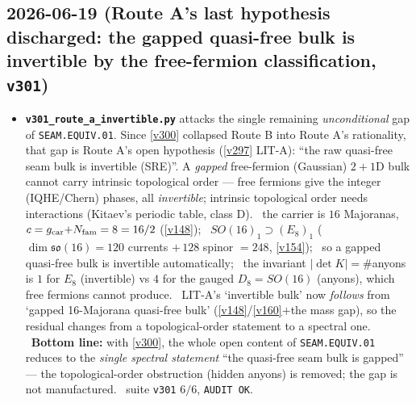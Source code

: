 \subsection*{2026-06-19 (Route A's last hypothesis discharged: the gapped quasi-free bulk is invertible by the free-fermion classification, \texttt{v301})}
\begin{itemize}
\item \textbf{\texttt{v301\_route\_a\_invertible.py}} attacks the single remaining \emph{unconditional} gap of
  \texttt{SEAM.EQUIV.01}.  Since \vref{v300} collapsed Route B into Route A's rationality, that gap is Route A's
  open hypothesis (\vref{v297} LIT-A): ``the raw quasi-free seam bulk is invertible (SRE)''.  A \emph{gapped}
  free-fermion (Gaussian) $2{+}1$D bulk cannot carry intrinsic topological order --- free fermions give the
  integer (IQHE/Chern) phases, all \emph{invertible}; intrinsic topological order needs interactions (Kitaev's
  periodic table, class D).  \mE\ the carrier is $16$ Majoranas, $c=g_{\mathrm{car}}{+}N_{\mathrm{fam}}=8=16/2$
  (\vref{v148}); \mE\ $SO(16)_1\supset(E_8)_1$ ($\dim\mathfrak{so}(16)=120$ currents $+\,128$ spinor $=248$,
  \vref{v154}); \mC\ so a gapped quasi-free bulk is invertible automatically; \mE\ the invariant
  $|\det K|=\#$anyons is $1$ for $E_8$ (invertible) vs $4$ for the gauged $D_8{=}SO(16)$ (anyons), which free
  fermions cannot produce.  \mO\ LIT-A's `invertible bulk' now \emph{follows} from `gapped 16-Majorana quasi-free
  bulk' (\vref{v148}/\vref{v160}$+$the mass gap), so the residual changes from a topological-order statement to a
  spectral one.  \mO\ \textbf{Bottom line:} with \vref{v300}, the whole open content of \texttt{SEAM.EQUIV.01}
  reduces to the \emph{single spectral statement} ``the quasi-free seam bulk is gapped'' --- the topological-order
  obstruction (hidden anyons) is removed; the gap is not manufactured.  \mE\ suite \texttt{v301} $6/6$,
  \texttt{AUDIT OK}.
\end{itemize}

